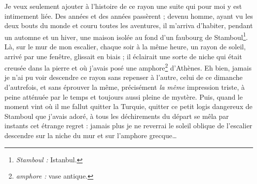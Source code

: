 {Je veux seulement ajouter à l’histoire de ce rayon une suite qui pour moi y est intimement liée. Des années et des années passèrent ; devenu homme, ayant vu les deux bouts du monde et couru toutes les aventures, il m’arriva d’habiter, pendant un automne et un hiver, une maison isolée au fond d’un faubourg de Stamboul\footnote{\emph{Stamboul :} Istanbul.}. Là, sur le mur de mon escalier, chaque soir à la même heure, un rayon de soleil, arrivé par une fenêtre, glissait en biais ; il éclairait une sorte de niche qui était creusée dans la pierre et où j’avais posé une amphore\footnote{\emph{amphore :} vase antique.} d’Athènes. Eh bien, jamais je n’ai pu voir descendre ce rayon sans repenser à l’autre, celui de ce dimanche d’autrefois, et sans éprouver la même, précisément \emph{la même} impression triste, à peine atténuée par le temps et toujours aussi pleine de mystère. Puis, quand le moment vint où il me fallut quitter la Turquie, quitter ce petit logis dangereux de Stamboul que j’avais adoré, à tous les déchirements du départ se mêla par instants cet étrange regret : jamais plus je ne reverrai le soleil oblique de l’escalier descendre sur la niche du mur et sur l’amphore grecque…
}



